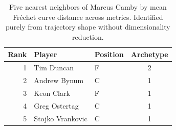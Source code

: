 \begin{table}[htbp]
  \centering\small
  \begin{tabular}{rllc}
    \toprule
    Rank & Player & Position & Archetype \\
    \midrule
    1 & Tim Duncan & F & 2 \\
    2 & Andrew Bynum & C & 1 \\
    3 & Keon Clark & F & 1 \\
    4 & Greg Ostertag & C & 1 \\
    5 & Stojko Vrankovic & C & 1 \\
    \bottomrule
  \end{tabular}
  \caption{Five nearest neighbors of Marcus Camby by mean Fr\'{e}chet curve distance across metrics. Identified purely from trajectory shape without dimensionality reduction.}
  \label{tab:Marcus_Camby_frechet_curve_neighbors}
\end{table}

